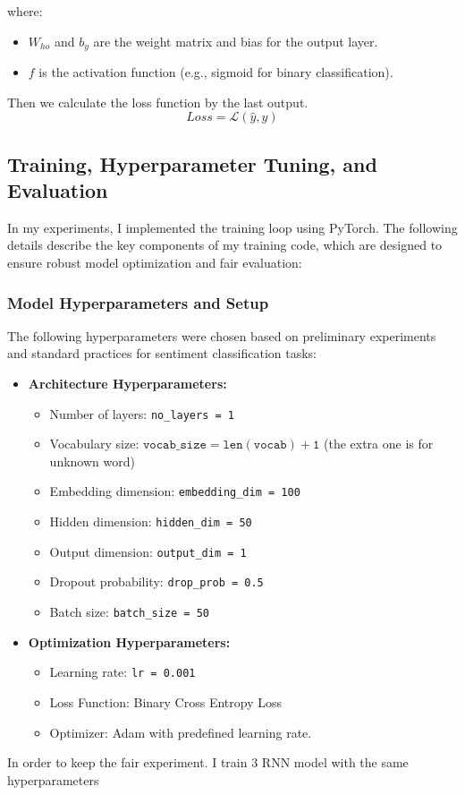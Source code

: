 \documentclass[12pt,a4paper]{article}
\begin{document}
where:
\begin{itemize}
    \item $W_{ho}$ and $b_y$ are the weight matrix and bias for the output layer.
    \item $f$ is the activation function (e.g., sigmoid for binary classification).
\end{itemize}

Then we calculate the loss function by the last output.
\begin{equation}
    Loss = \mathcal{L}(\hat{y}, y)
\end{equation}

\newpage
\subsection{Training, Hyperparameter Tuning, and Evaluation}
In my experiments, I implemented the training loop using PyTorch. The following details describe the key components of my training code, which are designed to ensure robust model optimization and fair evaluation:
    
\subsubsection{Model Hyperparameters and Setup}
The following hyperparameters were chosen based on preliminary experiments and standard practices for sentiment classification tasks:
\begin{itemize}
    \item \textbf{Architecture Hyperparameters:}
    \begin{itemize}
        \item Number of layers: \texttt{no\_layers = 1}
        \item Vocabulary size: \(\mathtt{vocab\_size = len(vocab) + 1}\) (the extra one is for unknown word)
        \item Embedding dimension: \texttt{embedding\_dim = 100}
        \item Hidden dimension: \texttt{hidden\_dim = 50}
        \item Output dimension: \texttt{output\_dim = 1}
        \item Dropout probability: \texttt{drop\_prob = 0.5}
        \item Batch size: \texttt{batch\_size = 50}
    \end{itemize}
    \item \textbf{Optimization Hyperparameters:}
    \begin{itemize}
        \item Learning rate: \texttt{lr = 0.001}
        \item Loss Function: Binary Cross Entropy Loss
        \item Optimizer: Adam with predefined learning rate.
    \end{itemize}
\end{itemize}
In order to keep the fair experiment. I train 3 RNN model with the same hyperparameters
\end{document}
